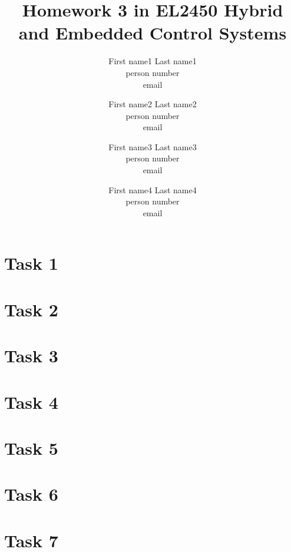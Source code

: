 \documentclass[a4paper,12pt,oneside,onecolumn]{article} %
\begin{document}

\title{Homework 3 in EL2450 Hybrid and Embedded Control Systems}
\author{
  First name1 Last name1 \\ person number \\ email
  \and
  First name2 Last name2 \\ person number \\ email
  \and
  First name3 Last name3 \\ person number \\ email
  \and
  First name4 Last name4 \\ person number \\ email
  \and
  }
\date{}

\maketitle                     %


\section*{Task 1}


\section*{Task 2}
%

\section*{Task 3}


\section*{Task 4}


\section*{Task 5}


\section*{Task 6}
%

\section*{Task 7}

\end{document}

